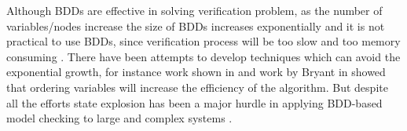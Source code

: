 Although BDDs are effective in solving verification problem, as the number of variables/nodes increase the size of BDDs increases exponentially and it is not practical to use BDDs, since verification process will be too slow and too memory consuming \cite{clarke1997model}. There have been attempts to develop techniques which can avoid the exponential growth, for instance work shown in \cite{Burch90symbolicmodel, Balarin:1993:IAL:647762.735495, Pixley:1992:ECS:113938.149645} and work by Bryant in \cite{Bryant:1986:GAB:6432.6433} showed that ordering variables will increase the efficiency of the algorithm. But despite all the efforts state explosion has been a major hurdle in applying BDD-based model checking to large and complex systems \cite{springerlink:10.1007-3-540-44577-3-12}.

